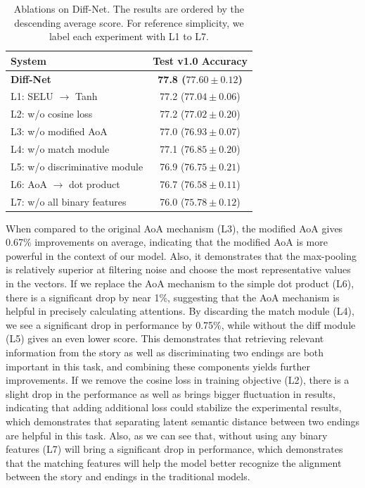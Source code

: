 \documentclass[letterpaper]{article} %
\begin{document}
\begin{table}[htbp]
\small
\begin{center}
\begin{tabular}{p{4cm} c}
\toprule
{\bf System} 					& {\bf Test v1.0 Accuracy} \\
\midrule
	\bf Diff-Net 					& \bf 77.8 ($77.60 \pm 0.12$) \\
	L1: SELU $\rightarrow$ Tanh 		& 77.2 ($77.04 \pm 0.06$) \\
	L2: w/o cosine loss				& 77.2 ($77.02 \pm 0.20$) \\
	L3: w/o modified AoA 			& 77.0 ($76.93 \pm 0.07$) \\
	L4: w/o match module 			& 77.1 ($76.85 \pm 0.20$) \\
	L5: w/o discriminative module 		& 76.9 ($76.75 \pm 0.21$) \\
	L6: AoA $\rightarrow$ dot product	& 76.7 ($76.58 \pm 0.11$) \\
	L7: w/o all binary features 		& 76.0 ($75.78 \pm 0.12$) \\
\bottomrule
\end{tabular}
\end{center}
\caption{\label{ablation-general} Ablations on Diff-Net. The results are ordered by the descending average score. For reference simplicity, we label each experiment with L1 to L7.}
    \end{table}    

When compared to the original AoA mechanism (L3), the modified AoA gives 0.67\% improvements on average, indicating that the modified AoA is more powerful in the context of our model. Also, it demonstrates that the max-pooling is relatively superior at filtering noise and choose the most representative values in the vectors. If we replace the AoA mechanism to the simple dot product (L6), there is a significant drop by near 1\%, suggesting that the AoA mechanism is helpful in precisely calculating attentions.
By discarding the match module (L4), we see a significant drop in performance by 0.75\%, while without the diff module (L5) gives an even lower score.
This demonstrates that retrieving relevant information from the story as well as discriminating two endings are both important in this task, and combining these components yields further improvements.
If we remove the cosine loss in training objective (L2), there is a slight drop in the performance as well as brings bigger fluctuation in results, indicating that adding additional loss could stabilize the experimental results, which demonstrates that separating latent semantic distance between two endings are helpful in this task.
Also, as we can see that, without using any binary features (L7) will bring a significant drop in performance, which demonstrates that the matching features will help the model better recognize the alignment between the story and endings in the traditional models.
\end{document}

